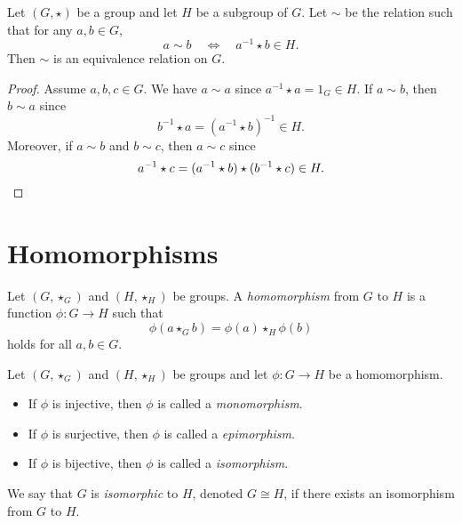 \begin{theorem}
  Let $(G, \star)$ be a group and let $H$ be a subgroup of $G$.
  Let $\sim$ be the relation such that for any $a, b \in G$,
  \begin{equation*}
    a \sim b
    \quad \Leftrightarrow \quad
    a^{-1} \star b \in H.
  \end{equation*}
  Then $\sim$ is an equivalence relation on $G$.
\end{theorem}
\begin{proof}
  Assume $a, b, c \in G$.
  We have $a \sim a$ since $a^{-1} \star a = 1_G \in H$.
  If $a \sim b$, then $b \sim a$ since
  \begin{equation*}
    b^{-1} \star a
    = (a^{-1} \star b)^{-1}
    \in H.
  \end{equation*}
  Moreover, if $a \sim b$ and $b \sim c$, then $a \sim c$ since
  \begin{equation*}
    a^{-1} \star c
    = (a^{-1} \star b) \star (b^{-1} \star c)
    \in H.
    \qedhere
  \end{equation*}
\end{proof}

\section{Homomorphisms}
\begin{definition}
  Let $(G, \star_G)$ and $(H, \star_H)$ be groups.
  A \emph{homomorphism} from $G$ to $H$ is a function $\phi: G \to H$ such that
  \begin{equation*}
    \phi(a \star_G b) = \phi(a) \star_H \phi(b)
  \end{equation*}
  holds for all $a, b \in G$.
\end{definition}

\begin{definition}
  Let $(G, \star_G)$ and $(H, \star_H)$ be groups and let $\phi: G \to H$ be a
  homomorphism.
  \begin{itemize}
    \item If $\phi$ is injective, then $\phi$ is called a \emph{monomorphism}.
    \item If $\phi$ is surjective, then $\phi$ is called a \emph{epimorphism}.
    \item If $\phi$ is bijective, then $\phi$ is called a \emph{isomorphism}.
  \end{itemize}
  We say that $G$ is \emph{isomorphic} to $H$, denoted $G \cong H$, if there
  exists an isomorphism from $G$ to $H$.
\end{definition}
